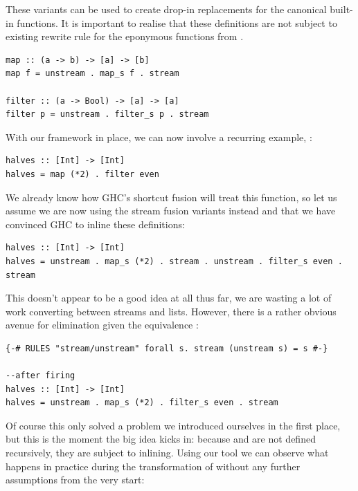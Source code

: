 These variants can be used to create drop-in replacements for the canonical built-in functions. It is important to realise that
these definitions are not subject to existing rewrite rule for the eponymous functions from .

\begin{listing}[H]
\begin{verbatim}
map :: (a -> b) -> [a] -> [b]
map f = unstream . map_s f . stream

filter :: (a -> Bool) -> [a] -> [a]
filter p = unstream . filter_s p . stream
\end{verbatim}
\end{listing}

With our framework in place, we can now involve a recurring example, :

\begin{listing}[H]
\begin{verbatim}
halves :: [Int] -> [Int]
halves = map (*2) . filter even
\end{verbatim}
\end{listing}

We already know how GHC's shortcut fusion will treat this function, so let us assume we are now using the stream fusion variants instead
and that we have convinced GHC to inline these definitions:

\begin{listing}[H]
\begin{verbatim}
halves :: [Int] -> [Int]
halves = unstream . map_s (*2) . stream . unstream . filter_s even . stream
\end{verbatim}
\end{listing}

This doesn't appear to be a good idea at all thus far, we are wasting a lot of work converting between streams and lists. However, there is a rather obvious
avenue for elimination given the equivalence :

\begin{listing}[H]
\begin{verbatim}
{-# RULES "stream/unstream" forall s. stream (unstream s) = s #-}

--after firing
halves :: [Int] -> [Int]
halves = unstream . map_s (*2) . filter_s even . stream
\end{verbatim}
\end{listing}

Of course this only solved a problem we introduced ourselves in the first place, but this is the moment the big idea kicks in: 
because  and  are not defined recursively, they are subject to inlining.
Using our tool we can observe what happens in practice during the transformation of 
without any further assumptions from the very start:

